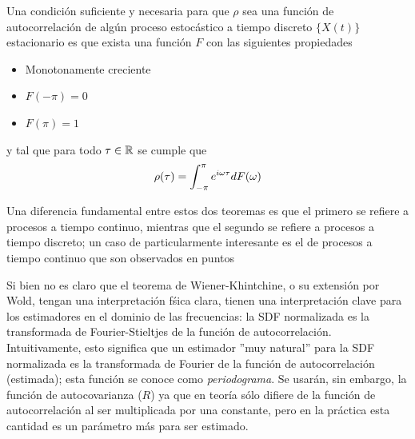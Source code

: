 \begin{thrm}[Wold]
Una condici\'on suficiente y necesaria para que $\rho$ sea una funci\'on de autocorrelaci\'on de 
alg\'un proceso estoc\'astico a tiempo discreto $\{X(t)\}$ estacionario
es que exista una funci\'on $F$ con las 
siguientes propiedades
\begin{itemize}
\item Monotonamente creciente
\item $F(-\pi) = 0$
\item $F(\pi) = 1$
\end{itemize}
y tal que para todo $\tau \in \mathbb{R}$ se cumple que
\begin{equation*}
\rho(\tau) = \int_{-\pi}^{\pi} e^{i \omega \tau} dF(\omega)
\end{equation*}
\end{thrm}

Una diferencia fundamental entre estos dos teoremas es que el primero se refiere a procesos a
tiempo continuo, mientras que el segundo se refiere a procesos a tiempo discreto; un caso de
particularmente interesante es el de procesos a tiempo continuo que son observados en puntos

Si bien no es claro que el teorema de Wiener-Khintchine, o su extensi\'on por Wold, tengan una
interpretaci\'on f\'sica clara, tienen una interpretaci\'on clave para los estimadores en el
dominio de las frecuencias:
la SDF normalizada es la transformada de Fourier-Stieltjes de la 
funci\'on de autocorrelaci\'on.
Intuitivamente, esto significa que un estimador ''muy natural'' para la SDF normalizada
es la transformada de Fourier de la funci\'on de autocorrelaci\'on (estimada);
esta funci\'on se conoce como \textit{periodograma}. Se usar\'an, sin embargo, la funci\'on
de autocovarianza ($R$) ya que en teor\'ia s\'olo difiere de la funci\'on de autocorrelaci\'on
al ser multiplicada por una constante, pero en la pr\'actica esta cantidad es un par\'ametro m\'as
para ser estimado.

